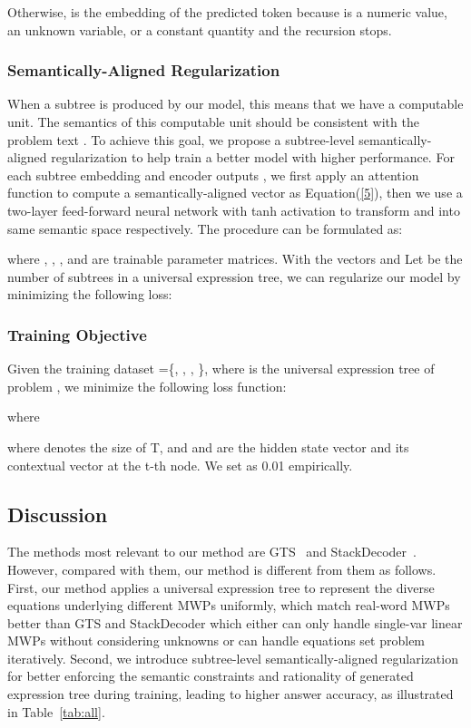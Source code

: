 \documentclass[11pt,a4paper]{article}
\begin{document}
Otherwise,  is the embedding  of the predicted token  because  is a numeric value, an unknown variable, or a constant quantity and the recursion stops. 

\subsubsection{Semantically-Aligned Regularization}
When a subtree  is produced by our model, this means that we have a computable unit. The semantics of this computable unit should be consistent with the problem text . To achieve this goal, we propose a subtree-level semantically-aligned regularization to help train a better model with higher performance. For each subtree embedding  and encoder outputs , we first apply an attention function to compute a semantically-aligned vector  as Equation(\ref{5}), then we use a two-layer feed-forward neural network with tanh activation to transform  and  into same semantic space respectively. The procedure can be formulated as:

where , , , and  are trainable parameter matrices. 
With the vectors  and 
Let  be the number of subtrees in a universal expression tree, we can regularize our model by minimizing the following loss:


\subsubsection{Training Objective}
Given the training dataset =\{, , , \}, where  is the universal expression tree of problem , we minimize the following loss function:

where

where  denotes the size of T, and  and  are the hidden state vector and its contextual vector at the t-th node. We set  as 0.01 empirically. 

\subsection{Discussion}
The methods most relevant to our method are GTS~\cite{seq2tree} and StackDecoder~\cite{stackdecoder}. However, compared with them, our method is different from them as follows. First, our method applies a universal expression tree to represent the diverse equations underlying different MWPs uniformly, which match real-word MWPs better than GTS and StackDecoder which either can only handle single-var linear MWPs without considering unknowns or can handle equations set problem iteratively. Second, we introduce subtree-level semantically-aligned regularization for better enforcing the semantic constraints and rationality of generated expression tree during training, leading to higher answer accuracy, as illustrated in Table~\ref{tab:all}.
\end{document}
